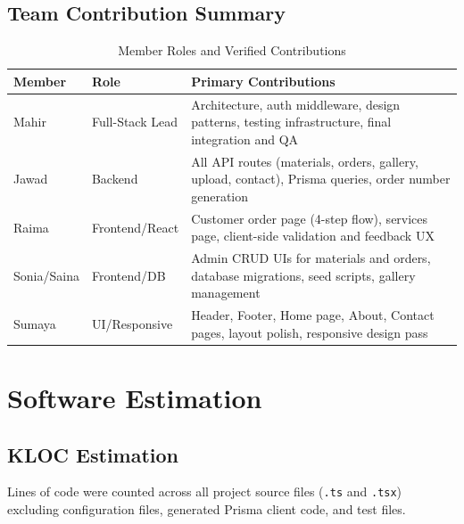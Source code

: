 \documentclass[12pt, a4paper]{article}
\begin{document}
\subsection{Team Contribution Summary}

\begin{table}[H]
\centering
\caption{Member Roles and Verified Contributions}
\begin{tabularx}{\textwidth}{llX}
\toprule
\textbf{Member} & \textbf{Role} & \textbf{Primary Contributions} \\
\midrule
Mahir   & Full-Stack Lead & Architecture, auth middleware, design patterns, testing infrastructure, final integration and QA \\
Jawad   & Backend         & All API routes (materials, orders, gallery, upload, contact), Prisma queries, order number generation \\
Raima   & Frontend/React  & Customer order page (4-step flow), services page, client-side validation and feedback UX \\
Sonia/Saina & Frontend/DB & Admin CRUD UIs for materials and orders, database migrations, seed scripts, gallery management \\
Sumaya  & UI/Responsive   & Header, Footer, Home page, About, Contact pages, layout polish, responsive design pass \\
\bottomrule
\end{tabularx}
\end{table}

\section{Software Estimation}

\subsection{KLOC Estimation}

Lines of code were counted across all project source files (\texttt{.ts} and \texttt{.tsx}) excluding configuration files, generated Prisma client code, and test files.
\end{document}
